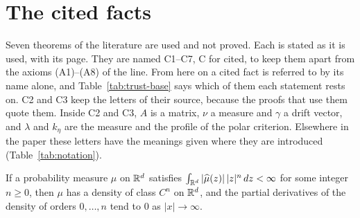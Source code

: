 \section{The cited facts}\label{supp:cited-facts}

Seven theorems of the literature are used and not proved. Each is stated as it is used, with its
page. They are named C1--C7, C for cited, to keep them apart from the axioms (A1)--(A8) of the line.
From here on a cited fact is referred to by its name alone, and Table~\ref{tab:trust-base} says
which of them each statement rests on. C2 and C3 keep the letters of their source, because the proofs that use
them quote them. Inside C2 and C3, $A$ is a matrix, $\nu$ a \Levy{} measure and $\gamma$ a drift
vector, and $\lambda$ and $k_\eta$ are the measure and the profile of the polar criterion. Elsewhere
in the paper these letters have the meanings given where they are introduced
(Table~\ref{tab:notation}).

\begin{theorem}\label{thm:cited-A1}
If a probability measure $\mu$ on $\mathbb{R}^d$ satisfies
$\int_{\mathbb{R}^d}|\widehat\mu(z)|\,|z|^n\,dz < \infty$ for some integer $n \ge 0$, then $\mu$ has a
density of class $C^n$ on $\mathbb{R}^d$, and the partial derivatives of the density of orders
$0, \dots, n$ tend to $0$ as $|x| \to \infty$.
\end{theorem}

